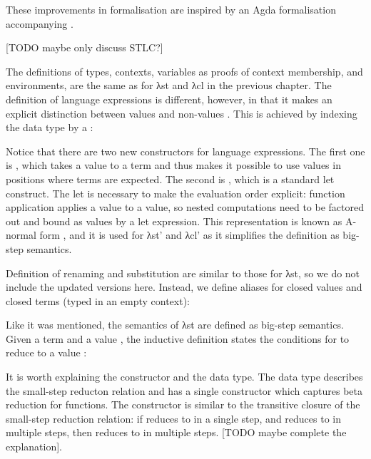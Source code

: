 \documentclass[bsc,frontabs,oneside,singlespacing,parskip,deptreport]{infthesis}
\theoremstyle{definition}
\theoremstyle{lemma}
\begin{document}
These improvements in formalisation are inspired by an Agda
formalisation accompanying \cite{DBLP:conf/cpp/McLaughlinMS18}.

[TODO maybe only discuss STLC?]

The definitions of types, contexts, variables as proofs of context
membership, and environments, are the same as for λst and λcl in the
previous chapter. The definition of language expressions is different,
however, in that it makes an explicit distinction between values  and
non-values . This is achieved by indexing the  data
type by a :



Notice that there are two new constructors for language
expressions. The first one is , which takes a value 
to a term  and thus makes it possible to use values in
positions where terms are expected. The second is , which is
a standard let construct. The let is necessary to make the evaluation
order explicit: function application applies a value to a value, so
nested computations need to be factored out and bound as values by a
let expression. This representation is known as A-normal form
\cite{DBLP:conf/lfp/SabryF92}, and it is used for λst' and λcl' as it
simplifies the definition as big-step semantics.

Definition of renaming and substitution are similar to those for
λst, so we do not include the updated versions here. Instead, we define
aliases for closed values  and closed terms  (typed
in an empty context):


Like it was mentioned, the semantics of λst are defined as big-step
semantics. Given a term  and a value , the inductive
definition  states the conditions for  to reduce to a
value :


It is worth explaining the  constructor and the 
data type. The  data type describes the small-step
reducton relation and has a single constructor which captures beta
reduction for functions. The  constructor is similar to the
transitive closure of the small-step reduction relation: if 
reduces to  in a single step, and  reduces to  in
multiple steps, then  reduces to  in multiple steps. [TODO
maybe complete the explanation].
\end{document}

